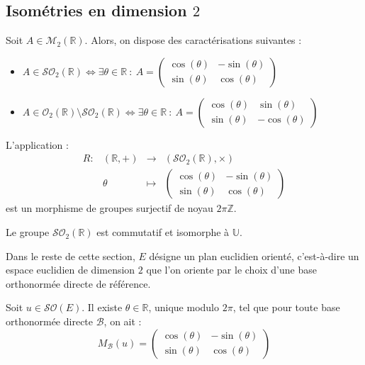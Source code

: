 \documentclass[french]{article}
\newcommand{\Z}{\mathbb{Z}}
\newcommand{\R}{\mathbb{R}}
\newcommand{\U}{\mathbb{U}}
\theoremstyle{plain}
\theoremstyle{definition}
\theoremstyle{remark}
\begin{document}
\subsection{Isométries en dimension $2$}

\begin{prop}
	Soit $A\in\mathcal{M}_2(\R)$. Alors, on dispose des caractérisations suivantes :
	\begin{itemize}
		\item $A\in\mathcal{SO}_2(\R)\iff \exists\theta\in\R\ : \ A=\displaystyle\begin{pmatrix}
			\cos(\theta)&-\sin(\theta)\\
			\sin(\theta)&\cos(\theta)
		\end{pmatrix}$
		\item $A\in\mathcal{O}_2(\R)\setminus\mathcal{SO}_2(\R)\iff \exists\theta\in\R\ : \ A=\displaystyle\begin{pmatrix}
			\cos(\theta)&\sin(\theta)\\
			\sin(\theta)&-\cos(\theta)
		\end{pmatrix}$
	\end{itemize}
\end{prop}

\begin{prop}
	L'application : $$\begin{array}{lrcl}
		R:&(\R,+)&\longrightarrow&(\mathcal{SO}_2(\R),\times)\\
		&\theta&\longmapsto&\displaystyle\begin{pmatrix}
			\cos(\theta)&-\sin(\theta)\\
			\sin(\theta)&\cos(\theta)
		\end{pmatrix} 
	\end{array}$$ est un morphisme de groupes surjectif de noyau $2\pi\Z$.
\end{prop}

\begin{cor}
	Le groupe $\mathcal{SO}_2(\R)$ est commutatif et isomorphe à $\U$.
\end{cor}

Dans le reste de cette section, $E$ désigne un plan euclidien orienté, c'est-à-dire un espace euclidien de dimension $2$ que l'on oriente par le choix d'une base orthonormée directe de référence.

\begin{prop}
	Soit $u\in\mathcal{SO}(E)$. Il existe $\theta\in\R$, unique modulo $2\pi$, tel que pour toute base orthonormée directe $\mathcal{B}$, on ait : $$M_\mathcal{B}(u)=\begin{pmatrix}
		\cos(\theta)&-\sin(\theta)\\
		\sin(\theta)&\cos(\theta)
	\end{pmatrix}$$
\end{prop}
\end{document}
